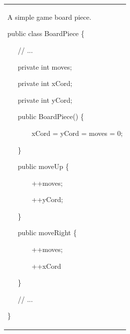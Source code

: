 \documentclass{article}
\newenvironment{tmindent}{\begin{tmparmod}{1.5em}{0pt}{0pt} }{\end{tmparmod}}
\newenvironment{tmparmod}[3]{\begin{list}{}{\setlength{\topsep}{0pt}\setlength{\leftmargin}{#1}\setlength{\rightmargin}{#2}\setlength{\parindent}{#3}\setlength{\listparindent}{\parindent}\setlength{\itemindent}{\parindent}\setlength{\parsep}{\parskip}} \item[]}{\end{list}}
\newenvironment{tmparsep}[1]{\begingroup\setlength{\parskip}{#1}}{\endgroup}
\begin{document}
\begin{tmparmod}{1cm}{0pt}{0pt}
  \begin{tmparmod}{0pt}{1cm}{0pt}
    {\noindent}{\noindent}\begin{tabular}{l}
      \begin{example}
        A simple game board piece.
        
        {\noindent}\begin{tmindent}
          \begin{tmparsep}{0em}
            public class BoardPiece \{
            
            \ \ \ // ...
            
            \ \ \ private int moves;
            
            \ \ \ private int xCord;
            
            \ \ \ private int yCord;
            
            
            
            \ \ \ public BoardPiece() \{
            
            \ \ \ \ \ \ \ xCord = yCord = moves = 0;
            
            \ \ \ \}
            
            
            
            \ \ \ public moveUp \{
            
            \ \ \ \ \ \ \ ++moves;
            
            \ \ \ \ \ \ \ ++yCord;
            
            \ \ \ \}
            
            
            
            \ \ \ public moveRight \{
            
            \ \ \ \ \ \ \ ++moves;
            
            \ \ \ \ \ \ \ ++xCord
            
            \ \ \ \}
            
            \ \ \ // ...
            
            \}
          \end{tmparsep}
        \end{tmindent}{\hspace*{\fill}}{\medskip}
      \end{example}
    \end{tabular}{\hspace*{\fill}}{\smallskip}
  \end{tmparmod}
\end{tmparmod}
\end{document}
